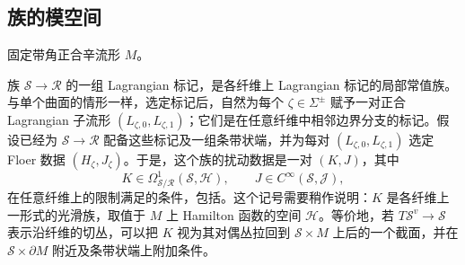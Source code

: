 \subsection{族的模空间}\label{sec:9h}
固定带角正合辛流形 $M$。
\begin{definition*}
族 $\mathcal S\to\mathcal R$ 的一组 Lagrangian 标记，是各纤维上 Lagrangian 标记的局部常值族。与单个曲面的情形一样，选定标记后，自然为每个 $\zeta\in\Sigma^\pm$ 赋予一对正合 Lagrangian 子流形 $(L_{\zeta,0},L_{\zeta,1})$；它们是在任意纤维中相邻边界分支的标记。假设已经为 $\mathcal S\to\mathcal R$ 配备这些标记及一组条带状端，并为每对 $(L_{\zeta,0},L_{\zeta,1})$ 选定 Floer 数据 $(H_\zeta,J_\zeta)$。于是，这个族的扰动数据是一对 $(K,J)$，其中
\[
K\in\Omega^1_{\mathcal S/\mathcal R}(\mathcal S,\mathcal H),\qquad
J\in C^\infty(\mathcal S,\mathcal J),
\]
在任意纤维上的限制满足的条件，包括。这个记号需要稍作说明：$K$ 是各纤维上一形式的光滑族，取值于 $M$ 上 Hamilton 函数的空间 $\mathcal H$。等价地，若 $T\mathcal S^v\to\mathcal S$ 表示沿纤维的切丛，可以把 $K$ 视为其对偶丛拉回到 $\mathcal S\times M$ 上后的一个截面，并在 $\mathcal S\times\partial M$ 附近及条带状端上附加条件。
\end{definition*}

